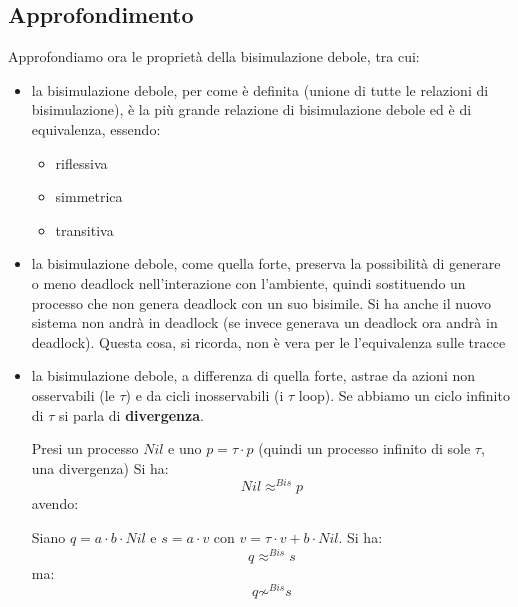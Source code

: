 \subsection{Approfondimento}
Approfondiamo ora le proprietà della bisimulazione debole, tra cui:
\begin{itemize}
  \item la bisimulazione debole, per come è definita (unione di tutte le
  relazioni di bisimulazione), è la più grande relazione di bisimulazione debole
  ed è di equivalenza, essendo:
  \begin{itemize}
    \item riflessiva
    \item simmetrica
    \item transitiva
  \end{itemize}
  \item la bisimulazione debole, come quella forte, preserva la possibilità di
  generare o meno deadlock nell'interazione con l'ambiente, quindi sostituendo
  un processo che non genera deadlock con un suo bisimile. Si ha anche il nuovo
  sistema non andrà in deadlock (se invece generava un deadlock ora andrà
  in deadlock). Questa cosa, si ricorda, non è vera per le l'equivalenza sulle
  tracce
  
  \item la bisimulazione debole, a differenza di quella forte, astrae da azioni
  non osservabili (le $\tau$) e da cicli inosservabili (i $\tau$ loop). Se abbiamo un
  ciclo infinito di $\tau$ si parla di \textbf{divergenza}.
  \begin{esempio}
    Presi un processo $Nil$ e uno $p=\tau\cdot p$ (quindi un processo infinito
    di sole $\tau$, una divergenza) Si ha:
    \[Nil\approx^{Bis}p\]
    avendo:
    \begin{center}
    \end{center}
  \end{esempio}
  \begin{esempio}
    Siano $q=a\cdot b\cdot Nil$ e $s= a\cdot v$ con $v=\tau\cdot v+b\cdot
    Nil$. Si ha:
    \[q\approx^{Bis} s\]
    ma:
    \[q\not\sim^{Bis} s\]


\end{esempio}
\end{itemize}

